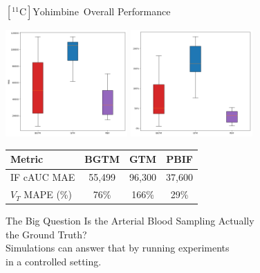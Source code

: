 \documentclass[aspectratio=169]{beamer}
\newcommand{\yohimbine}{$[^{11}\mathrm{C}]\text{Yohimbine}$}
\begin{document}
\begin{frame}[t]{\yohimbine\ Overall Performance}
	\centering
	\begin{center}
		\includegraphics[width=0.35\textwidth]{yoh_curve_mae_boxplot.png}
		\includegraphics[width=0.35\textwidth]{yoh_quantification_logan_mape_boxplot.png}
	\end{center}

	{
	\small
	\begin{tabular}{l|ccc}
		\toprule
		Metric          & BGTM   & GTM    & PBIF   \\
		\midrule
		IF cAUC MAE     & 55,499 & 96,300 & 37,600 \\
		$V_T$ MAPE (\%) & 76\%   & 166\%  & 29\%   \\
		\bottomrule
	\end{tabular}

	}
\end{frame}

\begin{frame}{The Big Question}
	\centering \huge{Is the Arterial Blood Sampling Actually \\the Ground Truth?}
	\pause
	\vspace{1em} \\
	\large{Simulations can answer that by running experiments\\ in a controlled setting.}
\end{frame}
\end{document}

